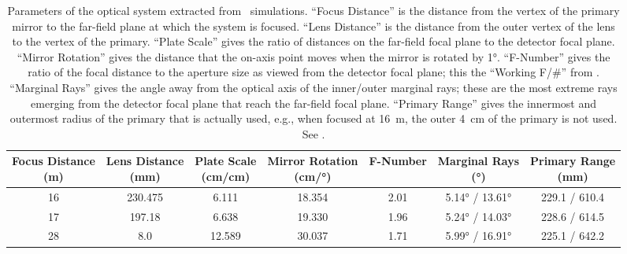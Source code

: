 \begin{table}
\centering
\caption[Parameters of the optical system extracted from \ZEMAX\ simulations]{
  Parameters of the optical system extracted from \ZEMAX\ simulations.
  ``Focus Distance'' is the distance from the vertex of the primary mirror to the far-field plane at which the system is focused.
  ``Lens Distance'' is the distance from the outer vertex of the lens to the vertex of the primary.
  ``Plate Scale'' gives the ratio of distances on the far-field focal plane to the detector focal plane.
  ``Mirror Rotation'' gives the distance that the on-axis point moves when the mirror is rotated by \ang{1}.
  ``F-Number'' gives the ratio of the focal distance to the aperture size as viewed from the detector focal plane; this the ``Working F/\#'' from \ZEMAX.
  ``Marginal Rays'' gives the angle away from the optical axis of the inner/outer marginal rays; these are the most extreme rays emerging from the detector focal plane that reach the far-field focal plane.
  ``Primary Range'' gives the innermost and outermost radius of the primary that is actually used, e.g., when focused at \SI{16}{\m}, the outer \SI{4}{\cm} of the primary is not used.
  See .
}
\label{tab:ch4-zemax-parms}
\begin{tabular}{ccccccc}
\toprule
  \specialcell{Focus Distance \\ (\si{\m})} &
  \specialcell{Lens Distance \\ (\si{\mm})} &
  \specialcell{Plate Scale \\ (\si{\cm}/\si{\cm})} &
  \specialcell{Mirror Rotation \\ (\si{\cm}/\si{\degree})} &
  \specialcell{F-Number  \\ } & 
  \specialcell{Marginal Rays \\ (\si{\degree})} &
  \specialcell{Primary Range \\ (\si{\mm})} \\
\midrule
16 & 230.475 &  6.111 & 18.354 & 2.01 &  \ang{5.14} / \ang{13.61} & 229.1 / 610.4 \\
17 & 197.18  &  6.638 & 19.330 & 1.96 &  \ang{5.24} / \ang{14.03} & 228.6 / 614.5 \\ 
28 &   8.0   & 12.589 & 30.037 & 1.71 &  \ang{5.99} / \ang{16.91} & 225.1 / 642.2 \\
\bottomrule
\end{tabular}
\end{table}

